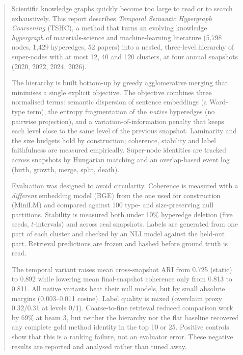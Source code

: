 \documentclass[11pt,a4paper]{article}
\theoremstyle{remark}
\begin{document}
\begin{abstract}
\noindent
Scientific knowledge graphs quickly become too large to read or to search
exhaustively. This report describes \emph{Temporal Semantic Hypergraph Coarsening}
(TSHC), a method that turns an evolving knowledge \emph{hypergraph} of
materials-science and machine-learning literature (5{,}798 nodes, 1{,}429
hyperedges, 52 papers) into a nested, three-level hierarchy of super-nodes
with at most 12, 40 and 120 clusters, at four annual snapshots (2020, 2022,
2024, 2026).

The hierarchy is built bottom-up by greedy agglomerative merging that minimises a
single explicit objective. The objective combines three normalised terms:
semantic dispersion of sentence embeddings (a Ward-type term), the entropy
fragmentation of the \emph{native} hyperedges (no pairwise projection), and a
variation-of-information penalty that keeps each level close to the same level of
the previous snapshot. Laminarity and the size budgets hold by construction;
coherence, stability and label faithfulness are measured empirically.
Super-node identities are tracked across snapshots by Hungarian matching and an
overlap-based event log (birth, growth, merge, split, death).

Evaluation was designed to avoid circularity. Coherence is measured with a
\emph{different} embedding model (BGE) from the one used for construction
(MiniLM) and compared against 100 type- and size-preserving null partitions.
Stability is measured both under 10\% hyperedge deletion (five seeds, $t$-intervals)
and across real snapshots. Labels are generated from one part of each cluster and
checked by an NLI model against the held-out part. Retrieval predictions are frozen
and hashed before ground truth is read.

The temporal variant raises mean cross-snapshot ARI from 0.725 (static) to 0.892
while lowering mean final-snapshot coherence only from 0.813 to 0.811. All native
variants beat their null models, but by small absolute margins (0.003--0.011
cosine). Label quality is mixed (overclaim proxy 0.32/0.31 at levels 0/1).
Coarse-to-fine retrieval reduced comparison work by 69\% at beam 3, but neither the
hierarchy nor the flat baseline recovered any complete gold method identity in the
top 10 or 25. Positive controls show that this is a ranking failure, not an evaluator
error. These negative results are reported and analysed rather than tuned away.
\end{abstract}
\end{document}
